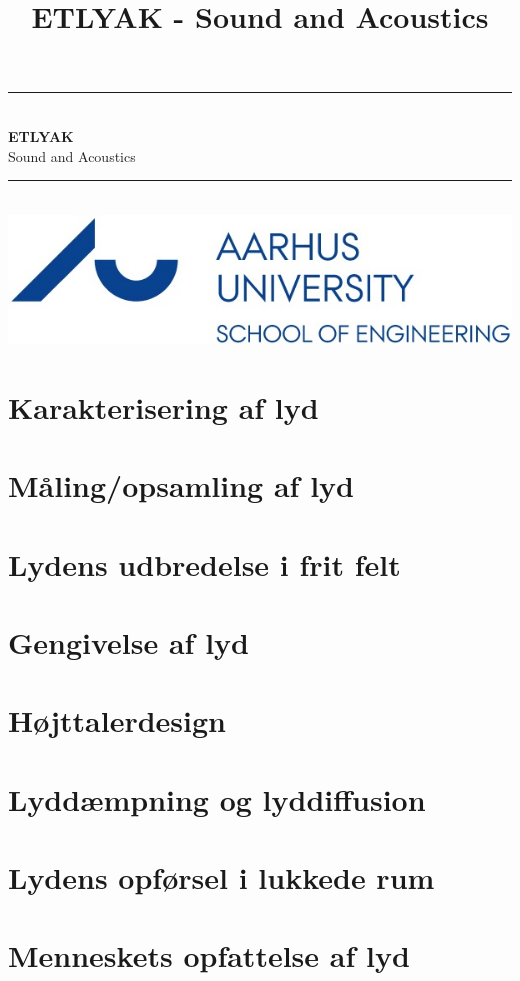 \documentclass[12pt,a4paper,danish]{book}
\title{ETLYAK - Sound and Acoustics}
\newcommand{\HRule}{\rule{\linewidth}{0.5mm}}
\begin{document}
\begin{titlepage}
	\clearpage\thispagestyle{empty}

	\begin{center}
		\HRule \\[0.4cm]
		{\huge \bfseries ETLYAK} \\[.3cm] {\huge Sound and Acoustics}\\[0cm]		
		\HRule \\[3.4cm]
		\includegraphics[width=0.5\linewidth]{graphics/au}
	\end{center}
	\renewcommand{\contentsname}{Indholdsfortegnelse}
	\tableofcontents

\end{titlepage}
 

\chapter{Karakterisering af lyd}


\chapter{Måling/opsamling af lyd}


\chapter{Lydens udbredelse i frit felt}


\chapter{Gengivelse af lyd}


\chapter{Højttalerdesign}


\chapter{Lyddæmpning og lyddiffusion}


\chapter{Lydens opførsel i lukkede rum}

\chapter{Menneskets opfattelse af lyd}
\end{document}
